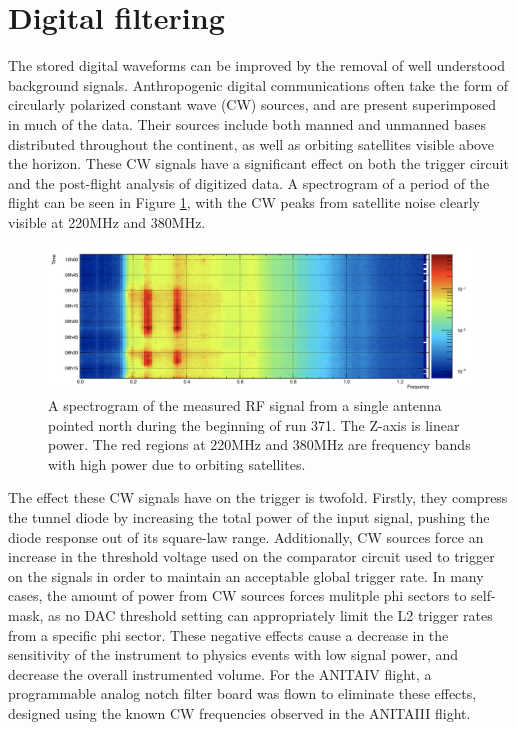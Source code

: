 		
\section{Digital filtering}
	The stored digital waveforms can be improved by the removal of well understood background signals.  Anthropogenic digital communications often take the form of circularly polarized constant wave (CW) sources, and are present superimposed in much of the data.  Their sources include both manned and unmanned bases distributed throughout the continent, as well as orbiting satellites visible above the horizon.  These CW signals have a significant effect on both the trigger circuit and the post-flight analysis of digitized data. A spectrogram of a period of the flight can be seen in Figure \ref{fig:spectrogram}, with the CW peaks from satellite noise clearly visible at 220MHz and 380MHz.

\begin{figure}
	\centering
	\includegraphics[width=\textwidth]{figures/spectrogram}
	\caption{A spectrogram of the measured RF signal from a single antenna pointed north during the beginning of run 371.  The Z-axis is linear power.  The red regions at 220MHz and 380MHz are frequency bands with high power due to orbiting satellites.} 
	\label{fig:spectrogram}
\end{figure}

	The effect these CW signals have on the trigger is twofold.  Firstly, they compress the tunnel diode by increasing the total power of the input signal, pushing the diode response out of its square-law range.  Additionally, CW sources force an increase in the threshold voltage used on the comparator circuit used to trigger on the signals in order to maintain an acceptable global trigger rate.  In many cases, the amount of power from CW sources forces mulitple phi sectors to self-mask, as no DAC threshold setting can appropriately limit the L2 trigger rates from a specific phi sector.  These negative effects cause a decrease in the sensitivity of the instrument to physics events with low signal power, and decrease the overall instrumented volume.  For the ANITAIV flight, a programmable analog notch filter board was flown to eliminate these effects, designed using the known CW frequencies observed in the ANITAIII flight.


